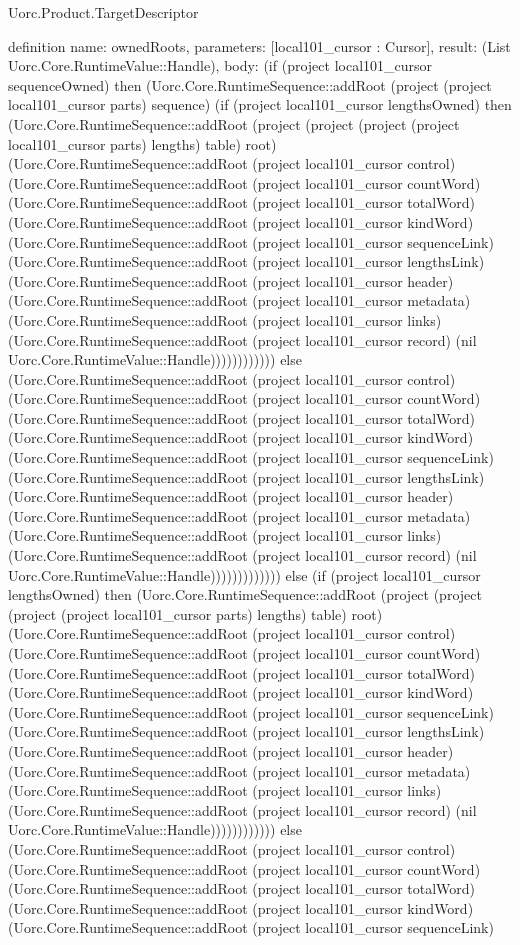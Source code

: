 \begin{lexlean}{Uorc.Product.TargetDescriptor}
\begin{semanticmodule}
definition{
  name: ownedRoots,
  parameters: [local101_cursor : Cursor],
  result: (List Uorc.Core.RuntimeValue::Handle),
  body: (if (project local101_cursor sequenceOwned) then (Uorc.Core.RuntimeSequence::addRoot (project (project local101_cursor parts) sequence) (if (project local101_cursor lengthsOwned) then (Uorc.Core.RuntimeSequence::addRoot (project (project (project (project local101_cursor parts) lengths) table) root) (Uorc.Core.RuntimeSequence::addRoot (project local101_cursor control) (Uorc.Core.RuntimeSequence::addRoot (project local101_cursor countWord) (Uorc.Core.RuntimeSequence::addRoot (project local101_cursor totalWord) (Uorc.Core.RuntimeSequence::addRoot (project local101_cursor kindWord) (Uorc.Core.RuntimeSequence::addRoot (project local101_cursor sequenceLink) (Uorc.Core.RuntimeSequence::addRoot (project local101_cursor lengthsLink) (Uorc.Core.RuntimeSequence::addRoot (project local101_cursor header) (Uorc.Core.RuntimeSequence::addRoot (project local101_cursor metadata) (Uorc.Core.RuntimeSequence::addRoot (project local101_cursor links) (Uorc.Core.RuntimeSequence::addRoot (project local101_cursor record) (nil Uorc.Core.RuntimeValue::Handle)))))))))))) else (Uorc.Core.RuntimeSequence::addRoot (project local101_cursor control) (Uorc.Core.RuntimeSequence::addRoot (project local101_cursor countWord) (Uorc.Core.RuntimeSequence::addRoot (project local101_cursor totalWord) (Uorc.Core.RuntimeSequence::addRoot (project local101_cursor kindWord) (Uorc.Core.RuntimeSequence::addRoot (project local101_cursor sequenceLink) (Uorc.Core.RuntimeSequence::addRoot (project local101_cursor lengthsLink) (Uorc.Core.RuntimeSequence::addRoot (project local101_cursor header) (Uorc.Core.RuntimeSequence::addRoot (project local101_cursor metadata) (Uorc.Core.RuntimeSequence::addRoot (project local101_cursor links) (Uorc.Core.RuntimeSequence::addRoot (project local101_cursor record) (nil Uorc.Core.RuntimeValue::Handle))))))))))))) else (if (project local101_cursor lengthsOwned) then (Uorc.Core.RuntimeSequence::addRoot (project (project (project (project local101_cursor parts) lengths) table) root) (Uorc.Core.RuntimeSequence::addRoot (project local101_cursor control) (Uorc.Core.RuntimeSequence::addRoot (project local101_cursor countWord) (Uorc.Core.RuntimeSequence::addRoot (project local101_cursor totalWord) (Uorc.Core.RuntimeSequence::addRoot (project local101_cursor kindWord) (Uorc.Core.RuntimeSequence::addRoot (project local101_cursor sequenceLink) (Uorc.Core.RuntimeSequence::addRoot (project local101_cursor lengthsLink) (Uorc.Core.RuntimeSequence::addRoot (project local101_cursor header) (Uorc.Core.RuntimeSequence::addRoot (project local101_cursor metadata) (Uorc.Core.RuntimeSequence::addRoot (project local101_cursor links) (Uorc.Core.RuntimeSequence::addRoot (project local101_cursor record) (nil Uorc.Core.RuntimeValue::Handle)))))))))))) else (Uorc.Core.RuntimeSequence::addRoot (project local101_cursor control) (Uorc.Core.RuntimeSequence::addRoot (project local101_cursor countWord) (Uorc.Core.RuntimeSequence::addRoot (project local101_cursor totalWord) (Uorc.Core.RuntimeSequence::addRoot (project local101_cursor kindWord) (Uorc.Core.RuntimeSequence::addRoot (project local101_cursor sequenceLink) }
\end{semanticmodule}
\end{lexlean}
